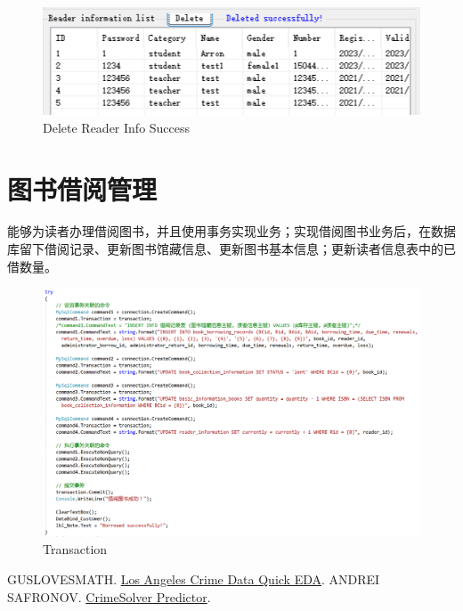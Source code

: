 \documentclass{article}
\begin{document}
\begin{figure}[H]
    \centering
    \includegraphics[width=1\textwidth]{../pic/delete_suc.png}
    \caption{Delete Reader Info Success}
    \label{fig:delete_suc}
\end{figure}

\section{图书借阅管理}
能够为读者办理借阅图书，并且使用事务实现业务；实现借阅图书业务后，在数据库留下借阅记录、更新图书馆藏信息、更新图书基本信息；更新读者信息表中的已借数量。

\begin{figure}[H]
    \centering
    \includegraphics[width=1\textwidth]{../pic/transaction.png}
    \caption{Transaction}
    \label{fig:transaction}
\end{figure}

\begin{thebibliography}{99}
     GUSLOVESMATH. \href{https://www.kaggle.com/code/guslovesmath/los-angeles-crime-data-quick-eda}{Los Angeles Crime Data Quick EDA}.
     ANDREI SAFRONOV. \href{https://www.kaggle.com/code/safronov00/crimesolver-predictor#2.-Clean-Data}{CrimeSolver Predictor}.
\end{thebibliography}
\end{document}
